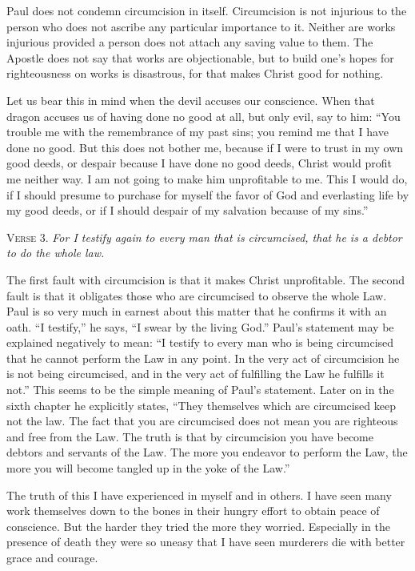 Paul does not condemn circumcision in itself. Circumcision is not injurious to the person who does not ascribe any particular importance to it. Neither are works injurious provided a person does not attach any saving value to them. The Apostle does not say that works are objectionable, but to build one’s hopes for righteousness on works is disastrous, for that makes Christ good for nothing.

Let us bear this in mind when the devil accuses our conscience. When that dragon accuses us of having done no good at all, but only evil, say to him: “You trouble me with the remembrance of my past sins; you remind me that I have done no good. But this does not bother me, because if I were to trust in my own good deeds, or despair because I have done no good deeds, Christ would profit me neither way. I am not going to make him unprofitable to me. This I would do, if I should presume to purchase for myself the favor of God and everlasting life by my good deeds, or if I should despair of my salvation because of my sins.”

\textsc{Verse} 3. \emph{For I testify again to every man that is circumcised, that he is a debtor to do the whole law.}

The first fault with circumcision is that it makes Christ unprofitable. The second fault is that it obligates those who are circumcised to observe the whole Law. Paul is so very much in earnest about this matter that he confirms it with an oath. “I testify,” he says, “I swear by the living God.” Paul’s statement may be explained negatively to mean: “I testify to every man who is being circumcised that he cannot perform the Law in any point. In the very act of circumcision he is not being circumcised, and in the very act of fulfilling the Law he fulfills it not.” This seems to be the simple meaning of Paul’s statement. Later on in the sixth chapter he explicitly states, “They themselves which are circumcised keep not the law. The fact that you are circumcised does not mean you are righteous and free from the Law. The truth is that by circumcision you have become debtors and servants of the Law. The more you endeavor to perform the Law, the more you will become tangled up in the yoke of the Law.”

The truth of this I have experienced in myself and in others. I have seen many work themselves down to the bones in their hungry effort to obtain peace of conscience. But the harder they tried the more they worried. Especially in the presence of death they were so uneasy that I have seen murderers die with better grace and courage.

